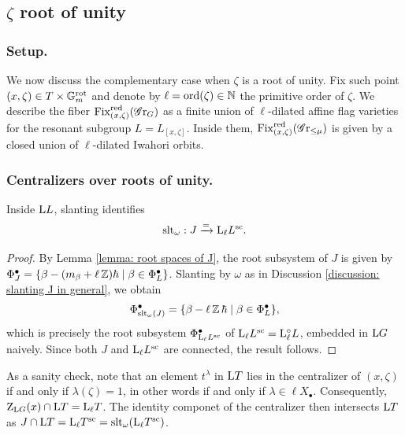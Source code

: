 \subsection{\texorpdfstring{$\zeta$}{Zeta} root of unity}\label{section: zeta root of unity}

\subsubsection{Setup.}
We now discuss the complementary case when $\zeta$ is a root of unity. Fix such point $(x, \zeta) \in T \times \mathbb{G}_m^{\mathrm{rot}}$ and denote by $\ell = \mathrm{ord}(\zeta) \in \operatorname{\mathbb{N}}$ the primitive order of $\zeta$.
%
We describe the fiber $\operatorname{Fix}^{\operatorname{red}}_{(x, \zeta)}(\operatorname{\mathscr{G}r}_G)$ as a finite union of $\ell$-dilated affine flag varieties for the resonant subgroup $L = L_{[x, \zeta]}$. Inside them, $\operatorname{Fix}^{\operatorname{red}}_{(x, \zeta)}(\operatorname{\mathscr{G}r}_{\leq \mu})$ is given by a closed union of $\ell$-dilated Iwahori orbits.



\subsubsection{Centralizers over roots of unity.}
\begin{lemma}\label{lemma: zeta root of unity -- computation of centralizer}
Inside $\mathrm{L} L$, slanting identifies
\begin{equation*}
    \operatorname{slt}_{\omega}: J \xrightarrow{=} \mathrm{L}_{\ell} L^{\mathrm{sc}}.
\end{equation*}
\end{lemma}
\begin{proof}
By Lemma \ref{lemma: root spaces of J}, the root subsystem of $J$ is given by  
$\Phi^{\bullet}_J = \{\beta - (m_{\beta} + \ell \operatorname{\mathbb{Z}})\hbar \mid \beta \in \Phi^{\bullet}_{L}\}$.
Slanting by $\omega$ as in Discussion \ref{discussion: slanting J in general}, we obtain
\begin{equation*}
\Phi^{\bullet}_{\operatorname{slt}_{\omega}(J)} = \{\beta - \ell \operatorname{\mathbb{Z}}\hbar \mid \beta \in \Phi^{\bullet}_{L}\},
\end{equation*}
which is precisely the root subsystem $\Phi^{\bullet}_{\mathrm{L}_{\ell} L^{\mathrm{sc}}}$ of $\mathrm{L}_{\ell} L^{\mathrm{sc}} = \mathrm{L}_{\ell}^{\circ} L$, embedded in $\mathrm{L} G$ naively. Since both $J$ and $\mathrm{L}_{\ell} L^{\mathrm{sc}}$ are connected, the result follows.
\end{proof}

\begin{remark}
As a sanity check, note that an element $t^{\lambda}$ in $\mathrm{L} T$ lies in the centralizer of $(x, \zeta)$ if and only if $\lambda(\zeta) = 1$, in other words if and only if $\lambda \in \ell X_{\bullet}$. Consequently, $\operatorname{Z}_{\mathrm{L} G}(x) \cap \mathrm{L} T = \mathrm{L}_{\ell} T$. The identity componet of the centralizer then intersects $\mathrm{L} T$ as $J \cap \mathrm{L} T = \mathrm{L}_{\ell} T^{\mathrm{sc}} = \operatorname{slt}_{\omega}(\mathrm{L}_{\ell} T^{\mathrm{sc}})$.
\end{remark}



